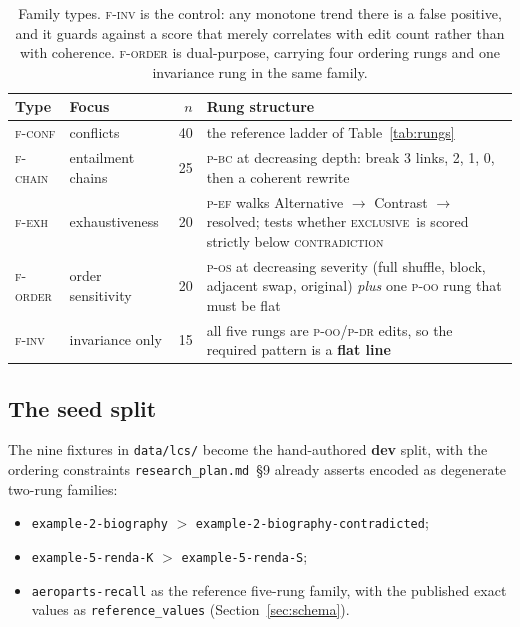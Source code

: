 \documentclass[11pt]{article}
\newcommand{\cCon}{\textsc{contradiction}}
\newcommand{\cExc}{\textsc{exclusive}}
\begin{document}
\begin{table}[h]\centering\small
\renewcommand{\arraystretch}{1.1}
\begin{tabular}{@{}llrp{7.4cm}@{}}
\toprule
\textbf{Type} & \textbf{Focus} & \textbf{$n$} & \textbf{Rung structure}\\
\midrule
\textsc{f-conf}  & conflicts        & 40 & the reference ladder of Table~\ref{tab:rungs}\\
\textsc{f-chain} & entailment chains& 25 & \textsc{p-bc} at decreasing depth: break 3 links, 2, 1, 0, then a coherent rewrite\\
\textsc{f-exh}   & exhaustiveness   & 20 & \textsc{p-ef} walks Alternative $\to$ Contrast $\to$ resolved; tests whether \cExc\ is scored strictly below \cCon\\
\textsc{f-order} & order sensitivity& 20 & \textsc{p-os} at decreasing severity (full shuffle, block, adjacent swap, original) \emph{plus} one \textsc{p-oo} rung that must be flat\\
\textsc{f-inv}   & invariance only  & 15 & all five rungs are \textsc{p-oo}/\textsc{p-dr} edits, so the required pattern is a \textbf{flat line}\\
\bottomrule
\end{tabular}
\caption{Family types. \textsc{f-inv} is the control: any monotone trend there is a false
positive, and it guards against a score that merely correlates with edit count rather than with
coherence. \textsc{f-order} is dual-purpose, carrying four ordering rungs and one invariance
rung in the same family.}
\label{tab:families}
\end{table}

\subsection{The seed split}
\label{sec:seed}

The nine fixtures in \texttt{data/lcs/} become the hand-authored \textbf{dev} split, with the
ordering constraints \texttt{research\_plan.md}~\S9 already asserts encoded as degenerate
two-rung families:

\begin{itemize}[leftmargin=*,nosep]
  \item \texttt{example-2-biography} $>$ \texttt{example-2-biography-contradicted};
  \item \texttt{example-5-renda-K} $>$ \texttt{example-5-renda-S};
  \item \texttt{aeroparts-recall} as the reference five-rung family, with the published exact
        values as \texttt{reference\_values} (Section~\ref{sec:schema}).
\end{itemize}
\end{document}
